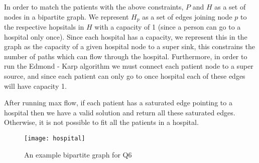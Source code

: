\documentclass[12pt]{article}
\newenvironment{problem}[2][Problem]{\begin{trivlist}
\item[\hskip \labelsep {\bfseries #1}\hskip \labelsep {\bfseries #2.}]}{\end{trivlist}}
\begin{document}
\begin{problem}{6: Match patients to hospitals using max flow}
In order to match the patients with the above constraints, $P$ and $H$ as a set of nodes in a bipartite graph. We represent $H_p$ as a set of edges joining node $p$ to the respective hopsitals in $H$ with a capacity of 1 (since a person can go to a hospital only once). Since each hospital has a capacity, we represent this in the graph as the capacity of a given hospital node to a super sink, this constrains the number of paths which can flow through the hospital. Furthermore, in order to run the Edmond - Karp algorithm we must connect each patient node to a super source, and since each patient can only go to once hospital each of these edges will have capacity 1.

After running max flow, if each patient has a saturated edge pointing to a hospital then we have a valid solution and return all these saturated edges. Otherwise, it is not possible to fit all the patients in a hospital.
\begin{figure}[H]
 \centering
  \texttt{[image: hospital]}
  \caption{An example  bipartite graph for Q6}
\end{figure}
\end{problem}
\end{document}
